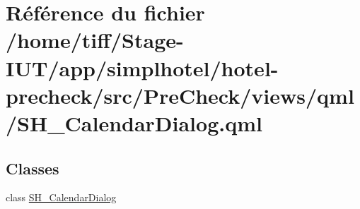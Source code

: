 \hypertarget{SH__CalendarDialog_8qml}{\section{Référence du fichier /home/tiff/\-Stage-\/\-I\-U\-T/app/simplhotel/hotel-\/precheck/src/\-Pre\-Check/views/qml/\-S\-H\-\_\-\-Calendar\-Dialog.qml}
\label{SH__CalendarDialog_8qml}
}
\subsection*{Classes}
\begin{DoxyCompactItemize}
\item 
class \hyperlink{classSH__CalendarDialog}{S\-H\-\_\-\-Calendar\-Dialog}
\end{DoxyCompactItemize}
